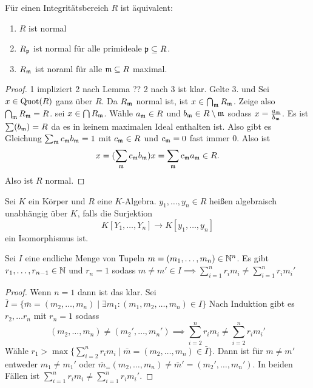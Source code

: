 \begin{Satz}
    Für einen Integritätsbereich \(R\) ist äquivalent:
    \begin{enumerate}
        \item \(R\) ist normal
        \item \(R_{\mathfrak{p}}\) ist normal für alle primideale \(\mathfrak{p}\subseteq R\).
        \item \(R_{\mathfrak{m}}\) ist noraml für alle \(\mathfrak{m}\subseteq R\) maximal.
    \end{enumerate}
\end{Satz}
\begin{proof}
    1 impliziert 2 nach Lemma ??
    2 nach 3 ist klar.
    Gelte 3. und Sei \(x\in\operatorname{Quot}(R)\) ganz über \(R\). Da \(R_{\mathfrak{m}}\) normal ist, ist \(x\in\bigcap_{\mathfrak{m}} R_{\mathfrak{m}}\). Zeige also \(\bigcap_{\mathfrak{m}} R_{\mathfrak{m}}=R\).
    sei \(x\in \bigcap R_{\mathfrak{m}}\).
    Wähle \(a_{\mathfrak{m}}\in R\) und \(b_{\mathfrak{m}} \in R\setminus\mathfrak{m}\) sodass \(x=\frac{a_{\mathfrak{m}}}{b_{\mathfrak{m}}}\). Es ist \(\sum(b_{\mathfrak{m}})=R\) da es in keinem maximalen Ideal enthalten ist. Also gibt es Gleichung \(\sum_{\mathfrak{m}} c_{\mathfrak{m}} b_{\mathfrak{m}}=1\) mit \(c_{\mathfrak{m}}\in R\) und \(c_{\mathfrak{m}}=0\) fast immer \(0\).
    Also ist \[x=(\sum_{\mathfrak{m}} c_{\mathfrak{m}} b_{\mathfrak{m}})x=\sum_{\mathfrak{m}} c_{\mathfrak{m}} a_{\mathfrak{m}}\in R.\] Also ist \(R\) normal.
\end{proof}
\begin{Def}
    Sei \(K\) ein Körper und \(R\) eine \(K\)-Algebra. \(y_1,\dots,y_n\in R\) heißen algebraisch unabhängig über \(K\), falls die Surjektion \[K[Y_1,\dots,Y_n]\to K[y_1,\dots,y_n]\] ein Isomorphismus ist.
\end{Def}
\begin{Lemma}
    Sei \(I\) eine endliche Menge von Tupeln \(m=(m_1,\dots,m_n)\in \mathbb{N}^n\).
    Es gibt \(r_1,\dots,r_{n-1}\in\mathbb{N}\) und \(r_n=1\) sodass 
    \(m\neq m'\in I\implies \sum_{i=1}^nr_im_i\neq \sum_{i=1}^nr_im_i'\)
\end{Lemma}
\begin{proof}
    Wenn \(n=1\) dann ist das klar.
    Sei \(\bar I=\{\bar m=(m_2,\dots,m_n)\mid \exists m_1\colon (m_1,m_2,\dots,m_n)\in I\}\)
    Nach Induktion gibt es \(r_2,\dots r_n\) mit \(r_n=1\) sodass \[(m_2,\dots,m_n)\neq (m_2',\dots,m_n')\implies \sum_{i=2}^nr_im_i\neq \sum_{i=2}^nr_im_i'\]
    Wähle \(r_1>\max\{\sum_{i=2}^nr_im_i\mid \bar m=(m_2,\dots,m_n)\in \bar I\}\).
    Dann ist für \(m\neq m'\) entweder \(m_1\neq m_1'\) oder \(\bar m_=(m_2,\dots,m_n)\neq \bar m'=(m_2',\dots,m_n')\).
    In beiden Fällen ist \(\sum_{i=1}^nr_im_i\neq \sum_{i=1}^nr_i m_i'\).
\end{proof}
